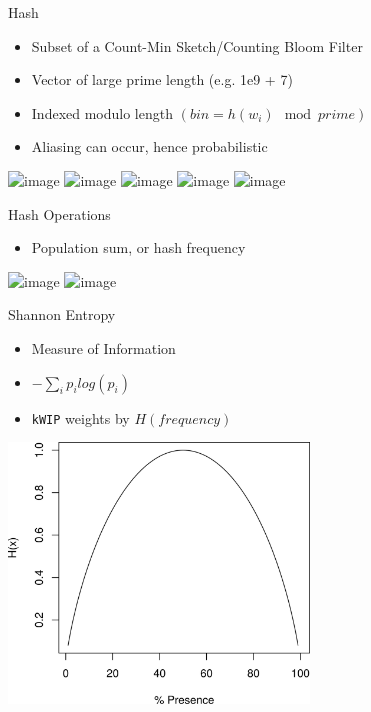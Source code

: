 \documentclass[t]{beamer}
\begin{document}
\begin{frame}{Hash}
  \begin{itemize}
    \item Subset of a Count-Min Sketch/Counting Bloom Filter
    \item Vector of large prime length (e.g. 1e9 + 7)
    \item Indexed modulo length $(bin = h(w_i) \mod prime)$
    \item Aliasing can occur, hence probabilistic
  \end{itemize}
  \begin{center}
    \includegraphics<1>[width=0.6\textwidth]{img/hash-0.png}
    \includegraphics<2>[width=0.6\textwidth]{img/hash-1.png}
    \includegraphics<3>[width=0.6\textwidth]{img/hash-2.png}
    \includegraphics<4>[width=0.6\textwidth]{img/hash-3.png}
    \includegraphics<5>[width=0.6\textwidth]{img/hash-4.png}
  \end{center}
\end{frame}


\begin{frame}{Hash Operations}
  \begin{itemize}
    \item Population sum, or hash frequency
  \end{itemize}
  \begin{center}
    \includegraphics<1>[width=0.6\textwidth]{img/hash-sums.png}
    \includegraphics<2>[width=0.6\textwidth]{img/hash-sumfreq.png}
  \end{center}
\end{frame}

\begin{frame}{Shannon Entropy}
  \begin{itemize}
    \item Measure of Information
    \item $ -\sum\limits_{i} p_i log(p_i) $
    \item \texttt{kWIP} weights by $H(frequency)$
  \end{itemize}
  \begin{center}
    \includegraphics[width=0.6\textwidth]{img/shanent.png}
  \end{center}
\end{frame}
\end{document}

